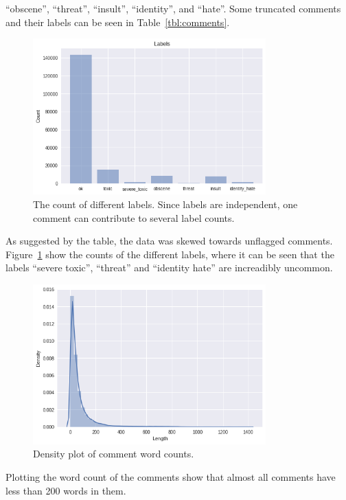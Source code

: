 ``obscene'', ``threat'', ``insult'',  ``identity'', and ``hate''. Some
truncated comments and their labels can be seen in
Table~\ref{tbl:comments}. 
\begin{figure}[H]
  \centering
  \includegraphics[width=0.8\textwidth]{graphics/label-dist}
  \caption{The count of different labels. Since labels are independent,
    one comment can contribute to several label counts.}\label{fig:labels-dist}
\end{figure}
As suggested by the table, the data was skewed towards
unflagged comments. Figure~\ref{fig:labels-dist} show the counts of the
different labels, where it can be seen that the labels ``severe
toxic'', ``threat'' and ``identity hate'' are increadibly uncommon.
\begin{figure}[H]
  \centering
  \includegraphics[width=0.8\textwidth]{graphics/comment-word-count}
  \caption{Density plot of comment word counts.}\label{fig:comment-word-count}
\end{figure}
Plotting the word count of the comments show that almost all comments
have less than 200 words in them.